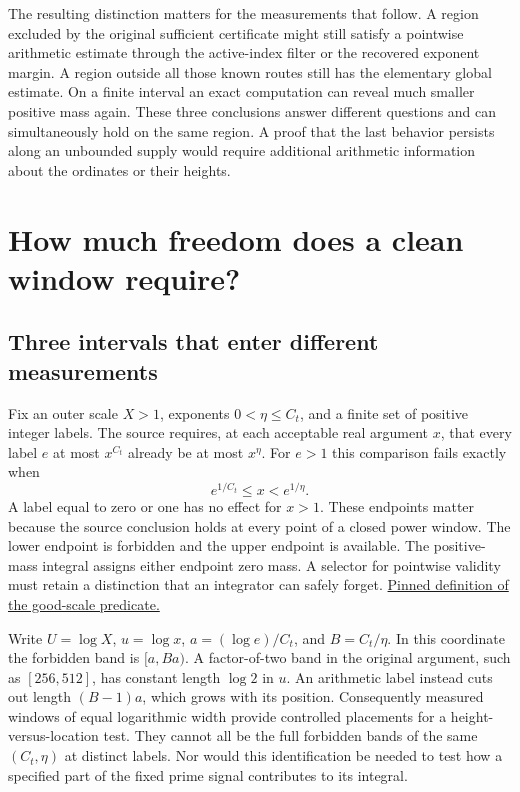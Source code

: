\documentclass[12pt,letterpaper]{article}
\begin{document}
The resulting distinction matters for the measurements that follow. A region excluded by the original sufficient certificate might still satisfy a pointwise arithmetic estimate through the active-index filter or the recovered exponent margin. A region outside all those known routes still has the elementary global estimate. On a finite interval an exact computation can reveal much smaller positive mass again. These three conclusions answer different questions and can simultaneously hold on the same region. A proof that the last behavior persists along an unbounded supply would require additional arithmetic information about the ordinates or their heights.


\section{How much freedom does a clean window require?}

\subsection{Three intervals that enter different measurements}
Fix an outer scale \(X>1\), exponents \(0<\eta\le C_t\), and a finite set of positive integer labels. The source requires, at each acceptable real argument \(x\), that every label \(e\) at most \(x^{C_t}\) already be at most \(x^\eta\). For \(e>1\) this comparison fails exactly when
\[
                 e^{1/C_t}\le x<e^{1/\eta}.
\]
A label equal to zero or one has no effect for \(x>1\). These endpoints matter because the source conclusion holds at every point of a closed power window. The lower endpoint is forbidden and the upper endpoint is available. The positive-mass integral assigns either endpoint zero mass. A selector for pointwise validity must retain a distinction that an integrator can safely forget. \href{https://github.com/nousentllc/riemann-hypothesis/blob/40e56bab026552e089d7afcfeff08d2defb9c005/src/Development/AutomorphicArithmetic/AutomorphicVarieties/LayeredIsomorphisms/SecondBound.lean#L46-L48}{Pinned definition of the good-scale predicate.}

Write \(U=\log X\), \(u=\log x\), \(a=(\log e)/C_t\), and \(B=C_t/\eta\). In this coordinate the forbidden band is \([a,Ba)\). A factor-of-two band in the original argument, such as \([256,512]\), has constant length \(\log 2\) in \(u\). An arithmetic label instead cuts out length \((B-1)a\), which grows with its position. Consequently measured windows of equal logarithmic width provide controlled placements for a height-versus-location test. They cannot all be the full forbidden bands of the same \((C_t,\eta)\) at distinct labels. Nor would this identification be needed to test how a specified part of the fixed prime signal contributes to its integral.
\end{document}

